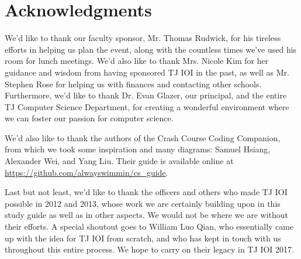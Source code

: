 \chapter{Acknowledgments}

We'd like to thank our faculty sponsor, Mr. Thomas Rudwick, for his tireless efforts in helping us plan the event, along with the countless times we've used his room for lunch meetings. We'd also like to thank Mrs. Nicole Kim for her guidance and wisdom from having sponsored TJ IOI in the past, as well as Mr. Stephen Rose for helping us with finances and contacting other schools. Furthermore, we'd like to thank Dr. Evan Glazer, our principal, and the entire TJ Computer Science Department, for creating a wonderful environment where we can foster our passion for computer science.

We'd also like to thank the authors of the Crash Course Coding Companion, from which we took some inspiration and many diagrams: Samuel Hsiang, Alexander Wei, and Yang Liu. Their guide is available online at \url{https://github.com/alwayswimmin/cs_guide}.

Last but not least, we'd like to thank the officers and others who made TJ IOI possible in 2012 and 2013, whose work we are certainly building upon in this study guide as well as in other aspects. We would not be where we are without their efforts. A special shoutout goes to William Luo Qian, who essentially came up with the idea for TJ IOI from scratch, and who has kept in touch with us throughout this entire process. We hope to carry on their legacy in TJ IOI 2017.
